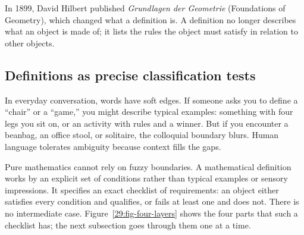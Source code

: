 In 1899, David Hilbert published \emph{Grundlagen der Geometrie} (Foundations of Geometry), which changed what a definition is. A definition no longer describes what an object is made of; it lists the rules the object must satisfy in relation to other objects.

\subsection{Definitions as precise classification tests}

In everyday conversation, words have soft edges. If someone asks you to define a ``chair'' or a ``game,'' you might describe typical examples: something with four legs you sit on, or an activity with rules and a winner. But if you encounter a beanbag, an office stool, or solitaire, the colloquial boundary blurs. Human language tolerates ambiguity because context fills the gaps.

Pure mathematics cannot rely on fuzzy boundaries. A mathematical definition works by an explicit set of conditions rather than typical examples or sensory impressions. It specifies an exact checklist of requirements: an object either satisfies every condition and qualifies, or fails at least one and does not. There is no intermediate case. Figure~\ref{29:fig-four-layers} shows the four parts that such a checklist has; the next subsection goes through them one at a time.

